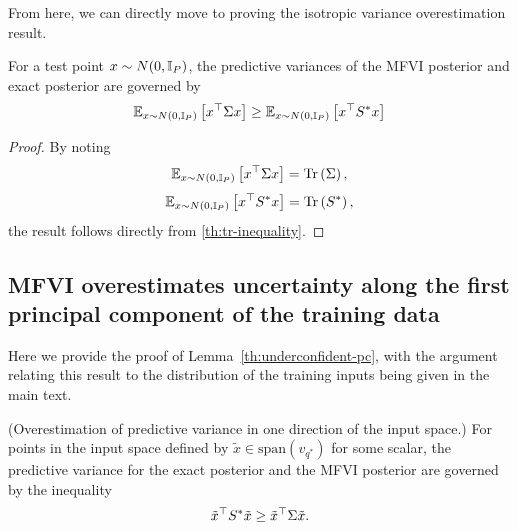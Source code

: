 From here, we can directly move to proving the isotropic variance overestimation result. 

\begin{lemma*}
    For a test point $x\sim N(0, \mathbb{I}_P)$, the predictive variances of the MFVI posterior and exact posterior are governed by 
    \begin{equation}
        \mathbb{E}_{x\sim N(0, \mathbb{I}_P)}\left[x^\top \Sigma x\right] \geq \mathbb{E}_{x\sim N(0, \mathbb{I}_P)}\left[x^\top S^* x\right]
    \end{equation}
\end{lemma*}
\begin{proof}
By noting 
    \begin{equation}
        \mathbb{E}_{x \sim N(0, \mathbb{I}_P)}\left[x^\top \Sigma x\right] = \text{Tr}\left(\Sigma\right), 
    \end{equation}
    \begin{equation}
    \mathbb{E}_{x \sim N(0, \mathbb{I}_P)}\left[x^\top S^* x\right] = \text{Tr}\left(S^*\right), 
    \end{equation}
    the result follows directly from \ref{th:tr-inequality}.
\end{proof}



\subsection{MFVI overestimates uncertainty along the first principal component of the training data}

Here we provide the proof of Lemma~\ref{th:underconfident-pc}, with the argument relating this result to the distribution of the training inputs being given in the main text. 

\begin{lemma*}
(Overestimation of predictive variance in one direction of the input space.) For points in the input space defined by $ \tilde x \in \text{span}(v_{q^*})$  for some scalar, the predictive variance for the exact posterior and the MFVI posterior are governed by the inequality 
    \begin{equation}
        \tilde x ^\top S^* \tilde x  \geq \tilde x^\top \Sigma \tilde x.
    \end{equation}
\end{lemma*} 


